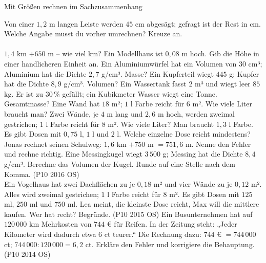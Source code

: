 \setcounter{aufgabe}{33}

\begin{aufgabe}{Mit Größen rechnen im Sachzusammenhang}
\begin{teile}
\teil Von einer $1{,}2$ m langen Leiste werden $45$ cm abgesägt; gefragt ist der Rest in cm. Welche Angabe musst du vorher umrechnen? Kreuze an.\\ \\ 
\teil $1{,}4$ km $+ 650$ m – wie viel km? \leerfeld[km]
\teil Ein Modellhaus ist $0{,}08$ m hoch. Gib die Höhe in einer handlicheren Einheit an. \leerfeld \leerfeld
\teil Ein Aluminiumwürfel hat ein Volumen von $30$ cm³; Aluminium hat die Dichte $2{,}7$ g/cm³. Masse? \leerfeld[g]
\teil Ein Kupferteil wiegt $445$ g; Kupfer hat die Dichte $8{,}9$ g/cm³. Volumen? \leerfeld[cm³]
\teil Ein Wassertank fasst $2$ m³ und wiegt leer $85$ kg. Er ist zu $30\,\%$ gefüllt; ein Kubikmeter Wasser wiegt eine Tonne. Gesamtmasse? \leerfeld[kg]
\teil Eine Wand hat $18$ m²; $1$ l Farbe reicht für $6$ m². Wie viele Liter braucht man? \leerfeld[l]
\teil Zwei Wände, je $4$ m lang und $2{,}6$ m hoch, werden zweimal gestrichen; $1$ l Farbe reicht für $8$ m². Wie viele Liter? \leerfeld[l]
\teil Man braucht $1{,}3$ l Farbe. Es gibt Dosen mit $0{,}75$ l, $1$ l und $2$ l. Welche einzelne Dose reicht mindestens? \leerfeld[l]
\teil Jonas rechnet seinen Schulweg: $1{,}6$ km $+ 750$ m $= 751{,}6$ m. Nenne den Fehler und rechne richtig.
\teil Eine Messingkugel wiegt $3\,500$ g; Messing hat die Dichte $8{,}4$ g/cm³. Berechne das Volumen der Kugel. Runde auf eine Stelle nach dem Komma. \hfill (P10 2016 OS) \\ \leerfeld[cm³]
\teil Ein Vogelhaus hat zwei Dachflächen zu je $0{,}18$ m² und vier Wände zu je $0{,}12$ m². Alles wird zweimal gestrichen; $1$ l Farbe reicht für $8$ m². Es gibt Dosen mit $125$ ml, $250$ ml und $750$ ml. Lea meint, die kleinste Dose reicht, Max will die mittlere kaufen. Wer hat recht? Begründe. \hfill (P10 2015 OS)
\teil Ein Busunternehmen hat auf $120\,000$ km Mehrkosten von $744$ € für Reifen. In der Zeitung steht: „Jeder Kilometer wird dadurch etwa $6$ ct teurer.“ Die Rechnung dazu: $744$ € $= 744\,000$ ct; $744\,000 : 120\,000 = 6{,}2$ ct. Erkläre den Fehler und korrigiere die Behauptung. \hfill (P10 2014 OS)
\end{teile}
\end{aufgabe}

